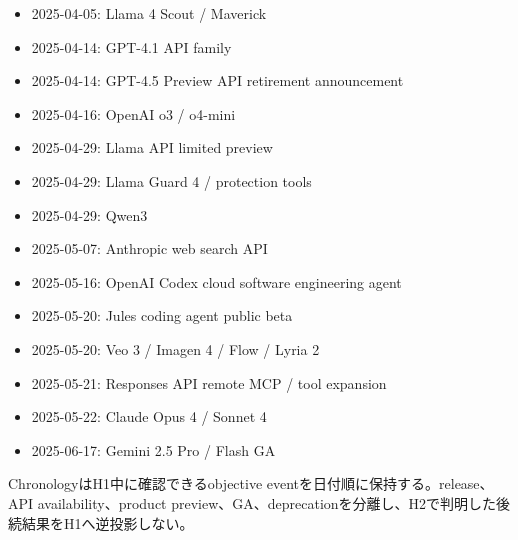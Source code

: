 \begin{itemize}
  \item 2025-04-05: Llama 4 Scout / Maverick
  \item 2025-04-14: GPT-4.1 API family
  \item 2025-04-14: GPT-4.5 Preview API retirement announcement
  \item 2025-04-16: OpenAI o3 / o4-mini
  \item 2025-04-29: Llama API limited preview
  \item 2025-04-29: Llama Guard 4 / protection tools
  \item 2025-04-29: Qwen3
\end{itemize}
\autocite{src-05f285e9757b,src-31799a46d8d0,src-383476bdf62e,src-3e4a3f3b3d83,src-bf92f3d905c3,src-fca961b24baf}

\begin{itemize}
  \item 2025-05-07: Anthropic web search API
  \item 2025-05-16: OpenAI Codex cloud software engineering agent
  \item 2025-05-20: Jules coding agent public beta
  \item 2025-05-20: Veo 3 / Imagen 4 / Flow / Lyria 2
  \item 2025-05-21: Responses API remote MCP / tool expansion
  \item 2025-05-22: Claude Opus 4 / Sonnet 4
\end{itemize}
\autocite{src-4ec03078d316,src-8b595b787bad,src-9257c39d4172,src-e31c642d34b6,src-e68f8ce96685,src-e7aef8f1b13b}

\begin{itemize}
  \item 2025-06-17: Gemini 2.5 Pro / Flash GA
\end{itemize}
\autocite{src-53f15d483a2d}

\begin{claimboundary}
ChronologyはH1中に確認できるobjective eventを日付順に保持する。release、API availability、product preview、GA、deprecationを分離し、H2で判明した後続結果をH1へ逆投影しない。
\end{claimboundary}
